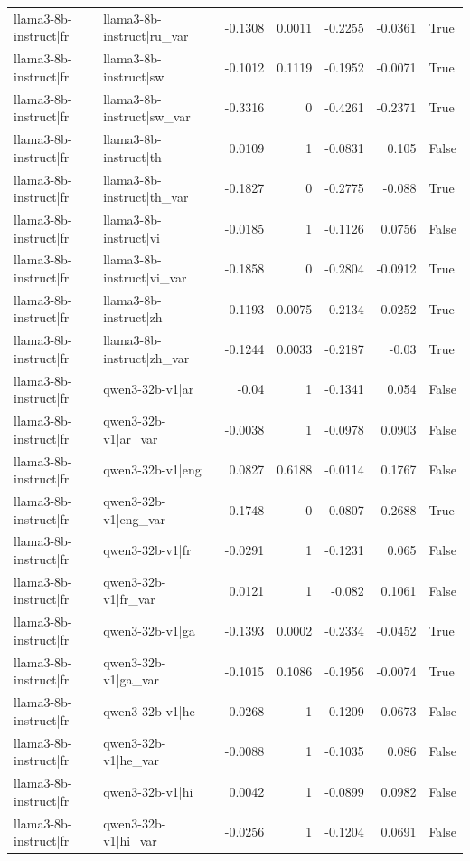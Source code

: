 \begin{table}
\begin{tabular}{l l r r r r l}
llama3-8b-instruct|fr & llama3-8b-instruct|ru_var & -0.1308 & 0.0011 & -0.2255 & -0.0361 & True \\
llama3-8b-instruct|fr & llama3-8b-instruct|sw & -0.1012 & 0.1119 & -0.1952 & -0.0071 & True \\
llama3-8b-instruct|fr & llama3-8b-instruct|sw_var & -0.3316 & 0 & -0.4261 & -0.2371 & True \\
llama3-8b-instruct|fr & llama3-8b-instruct|th & 0.0109 & 1 & -0.0831 & 0.105 & False \\
llama3-8b-instruct|fr & llama3-8b-instruct|th_var & -0.1827 & 0 & -0.2775 & -0.088 & True \\
llama3-8b-instruct|fr & llama3-8b-instruct|vi & -0.0185 & 1 & -0.1126 & 0.0756 & False \\
llama3-8b-instruct|fr & llama3-8b-instruct|vi_var & -0.1858 & 0 & -0.2804 & -0.0912 & True \\
llama3-8b-instruct|fr & llama3-8b-instruct|zh & -0.1193 & 0.0075 & -0.2134 & -0.0252 & True \\
llama3-8b-instruct|fr & llama3-8b-instruct|zh_var & -0.1244 & 0.0033 & -0.2187 & -0.03 & True \\
llama3-8b-instruct|fr & qwen3-32b-v1|ar & -0.04 & 1 & -0.1341 & 0.054 & False \\
llama3-8b-instruct|fr & qwen3-32b-v1|ar_var & -0.0038 & 1 & -0.0978 & 0.0903 & False \\
llama3-8b-instruct|fr & qwen3-32b-v1|eng & 0.0827 & 0.6188 & -0.0114 & 0.1767 & False \\
llama3-8b-instruct|fr & qwen3-32b-v1|eng_var & 0.1748 & 0 & 0.0807 & 0.2688 & True \\
llama3-8b-instruct|fr & qwen3-32b-v1|fr & -0.0291 & 1 & -0.1231 & 0.065 & False \\
llama3-8b-instruct|fr & qwen3-32b-v1|fr_var & 0.0121 & 1 & -0.082 & 0.1061 & False \\
llama3-8b-instruct|fr & qwen3-32b-v1|ga & -0.1393 & 0.0002 & -0.2334 & -0.0452 & True \\
llama3-8b-instruct|fr & qwen3-32b-v1|ga_var & -0.1015 & 0.1086 & -0.1956 & -0.0074 & True \\
llama3-8b-instruct|fr & qwen3-32b-v1|he & -0.0268 & 1 & -0.1209 & 0.0673 & False \\
llama3-8b-instruct|fr & qwen3-32b-v1|he_var & -0.0088 & 1 & -0.1035 & 0.086 & False \\
llama3-8b-instruct|fr & qwen3-32b-v1|hi & 0.0042 & 1 & -0.0899 & 0.0982 & False \\
llama3-8b-instruct|fr & qwen3-32b-v1|hi_var & -0.0256 & 1 & -0.1204 & 0.0691 & False \\

\end{tabular}
\end{table}
